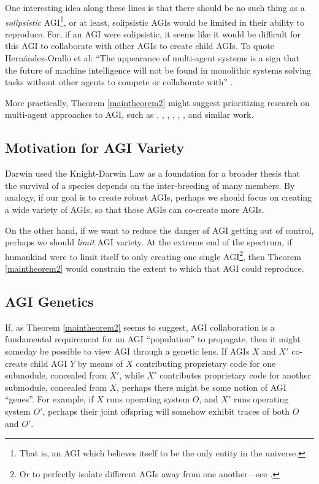 \documentclass[runningheads]{llncs}
\begin{document}
One interesting idea along these lines is that there should be no
such thing as a \emph{solipsistic} AGI\footnote{That is, an AGI which believes itself
to be the only entity in the universe.}, or at least, solipsistic AGIs would be
limited in their ability to reproduce.
For, if an AGI were solipsistic, it
seems like it would be difficult for this AGI to collaborate with other AGIs
to create child AGIs.
To quote Hern{\'a}ndez-Orallo et al: ``The appearance of multi-agent systems is a sign that
the future of machine intelligence will not be found in monolithic systems
solving tasks without other agents to compete or collaborate with''
\cite{hernandez2011more}.

More practically,
Theorem \ref{maintheorem2} might suggest
prioritizing research on multi-agent approaches to AGI, such as
\cite{castelfranchi1998modelling}, \cite{hernandez2011more},
\cite{hibbard2011societies},
\cite{thorisson2004constructionist}, \cite{potyka2016group},
\cite{kolonin2018reputation},
and similar work.

\subsection{Motivation for AGI Variety}

Darwin used the Knight-Darwin Law as a foundation for
a broader thesis that the survival of a
species depends on the inter-breeding of many members.
By analogy, if our goal is to create robust AGIs, perhaps
we should focus on creating a wide variety of AGIs, so that
those AGIs can co-create more AGIs.

On the other hand, if we want to reduce the danger of AGI getting out of control,
perhaps we should \emph{limit} AGI variety. At the extreme end
of the spectrum, if humankind were to limit itself to only creating one single
AGI\footnote{Or to perfectly isolate
different AGIs away from
one another---see \cite{yampolskiy2012leakproofing}.}, then
Theorem \ref{maintheorem2} would constrain the extent to which
that AGI could reproduce.


\subsection{AGI Genetics}

If, as Theorem \ref{maintheorem2} seems to suggest, AGI collaboration
is a fundamental requirement for an AGI ``population'' to propagate, then it might
someday be possible to view AGI through a genetic lens. If AGIs $X$ and $X'$
co-create child AGI $Y$ by
means of $X$ contributing proprietary code for one submodule, concealed from $X'$,
while $X'$ contributes proprietary code for another submodule, concealed from $X$,
perhaps there might be some notion of AGI ``genes''. For example, if $X$ runs operating
system $O$, and $X'$ runs operating system $O'$, perhaps their joint offspring
will somehow exhibit traces of both $O$ and $O'$.
\end{document}
